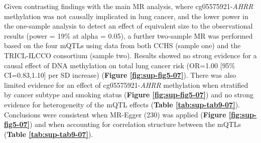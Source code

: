 \documentclass[11pt,oneside]{bristolthesis}
\begin{document}
\begin{table}[!h]

\caption{\label{tab:sup-tab8-07}One-sample MR analysis of the effect of \textit{AHRR} methylation (\%) on lung cancer risk in the CCHS}
\centering
{}
\end{table}
\linebreak

Given contrasting findings with the main MR analysis, where cg05575921-\emph{AHRR} methylation was not causally implicated in lung cancer, and the lower power in the one-sample analysis to detect an effect of equivalent size to the observational results (power = 19\% at alpha = 0.05), a further two-sample MR was performed based on the four mQTLs using data from both CCHS (sample one) and the TRICL-ILCCO consortium (sample two). Results showed no strong evidence for a causal effect of DNA methylation on total lung cancer risk (OR=1.00 {[}95\% CI=0.83,1.10{]} per SD increase) (\textbf{Figure \ref{fig:sup-fig5-07}}). There was also limited evidence for an effect of cg05575921-\emph{AHRR} methylation when stratified by cancer subtype and smoking status (\textbf{Figure \ref{fig:sup-fig5-07}}) and no strong evidence for heterogeneity of the mQTL effects (\textbf{Table \ref{tab:sup-tab9-07}}). Conclusions were consistent when MR-Egger (230) was applied (\textbf{Figure \ref{fig:sup-fig5-07}}) and when accounting for correlation structure between the mQTLs (\textbf{Table \ref{tab:sup-tab9-07}}).
\end{document}
